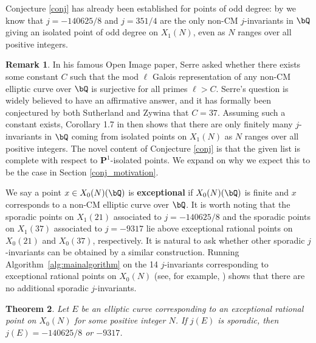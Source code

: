 \documentclass[11pt,reqno]{amsart}
\theoremstyle{plain}
\newtheorem{theorem}{Theorem}%
\theoremstyle{definition}
\newtheorem{remark}[theorem]{Remark}
\newcommand{\Q}{\bQ}
\newcommand{\PP}{\mathbf P}
\newcommand{\abbey}[1]{\textcolor{blue}{Abbey: #1}}
\begin{document}
Conjecture \ref{conj} has already been established for points of odd degree: by \cite{OddDeg} we know that $j=-140625/8$ and $j=351/4$ are the only non-CM $j$-invariants in $\Q$ giving an isolated point of odd degree on $X_1(N)$, even as $N$ ranges over all positive integers.

\begin{remark}
        In his famous Open Image paper, Serre asked whether there exists some constant $C$ such that the mod $\ell$ Galois representation of any non-CM elliptic curve over $\Q$ is surjective for all primes $\ell>C$. Serre's question is widely believed to have an affirmative answer, and it has formally been conjectured by both Sutherland \cite{sutherland} and Zywina \cite{ZywinaImages} that $C = 37$. Assuming such a constant exists, Corollary 1.7 in \cite{BELOV} then shows that there are only finitely many $j$-invariants in $\Q$ coming from isolated points on $X_1(N)$ as $N$ ranges over all positive integers. The novel content of Conjecture \ref{conj} is that the given list is complete with respect to $\PP^1$-isolated points. We expand on why we expect this to be the case in Section \ref{conj_motivation}.
\end{remark}




We say a point $x \in X_0(N)(\Q)$ is \textbf{exceptional} if $X_0(N)(\Q)$ is finite and $x$ corresponds to a non-CM elliptic curve over $\Q$. It is worth noting that the sporadic points on $X_1(21)$ associated to $j=-140625/8$ and the sporadic points on $X_1(37)$ associated to $j=-9317$ lie above exceptional rational points on $X_0(21)$ and $X_0(37)$, respectively. It is natural to ask whether other sporadic $j$-invariants can be obtained by a similar construction. Running Algorithm~\ref{alg:mainalgorithm} on the 14 $j$-invariants corresponding to exceptional rational points on $X_0(N)$ (see, for example, \cite[Table 4]{LRAnn}) shows that there are no additional sporadic $j$-invariants.
\begin{theorem}
Let $E$ be an elliptic curve corresponding to an exceptional rational point on $X_0(N)$ for some positive integer $N$. If $j(E)$ is sporadic, then $j(E)=-140625/8$ or $-9317$.
\end{theorem}
\end{document}
